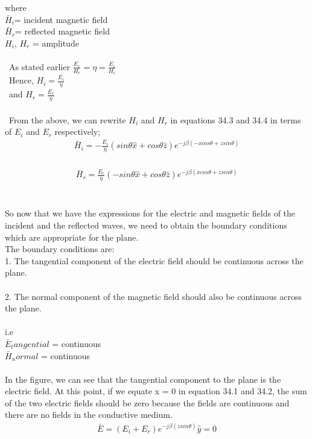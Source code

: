 where
\\ $\bar{H}_i$= incident magnetic field
\\ $\bar{H}_r$= reflected magnetic field
\\ $H_i$, $H_r$ = amplitude
\\ \\\ As stated earlier $\frac{E_r}{H_r} = \eta = \frac{E_i}{H_i}$
\\\ Hence, $H_i = \frac{E_i}{\eta}$
\\\    and $H_r = \frac{E_r}{\eta}$
\\\ \\\ From the above, we can rewrite $H_i$ and $H_r$ in equations 34.3 and 34.4 in terms
of $E_i$ and $E_r$ respectively;
\\ \begin{align}
\bar{H}_i = - \frac{E_i}{\eta} (sin\theta \hat{x} + cos\theta \hat{z})e^{-j\beta (-xcos\theta + zsin\theta)}
\end{align}
\\ \begin{align}
\bar{H}_r =  \frac{E_r}{\eta} (-sin\theta \hat{x} + cos\theta \hat{z})e^{-j\beta (xcos\theta + zsin\theta)}
\end{align}
\\\\ So now that we have the expressions for the electric and magnetic
fields of the incident and the reflected waves, we need to obtain the
boundary conditions which are appropriate for the plane.\\ The boundary conditions are:
\\
1. The tangential component of the electric field should be continuous across the plane.
\\\\ 2. The normal component of the magnetic field should also be continuous across the plane.
\\\\ i.e
\\ $\bar{E}_tangential$ = continuous
\\ $\bar{H}_normal$ = continuous
\\\\ In the figure, we can see that the tangential component to the plane is
the electric field. At this point, if we equate x = 0 in equation 34.1 and 34.2, the sum of the two electric fields should be zero because
the fields are continuous and there are no fields in the conductive medium.
\\ \begin{align}
\bar{E} = (E_i + E_r) e^{-j\beta(zsin\theta) }\hat{y} = 0
\end{align}
